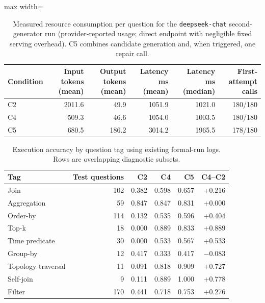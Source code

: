 \documentclass[11pt]{article}
\begin{document}
\begin{table}[htbp]
\caption{Measured resource consumption per question for the \texttt{deepseek-chat} second-generator run (provider-reported usage; direct endpoint with negligible fixed serving overhead). C5 combines candidate generation and, when triggered, one repair call.}
\label{tab:sup-deepseek-tokens}
\centering
\small
\begin{adjustbox}{max width=\textwidth}
\begin{tabular}{lrrrrr}
\toprule
\textbf{Condition} & \textbf{Input tokens (mean)} & \textbf{Output tokens (mean)} & \textbf{Latency ms (mean)} & \textbf{Latency ms (median)} & \textbf{First-attempt calls} \\
\midrule
C2 & 2011.6 & 49.9 & 1051.9 & 1021.0 & 180/180 \\
C4 & 509.3 & 46.6 & 1054.0 & 1003.5 & 180/180 \\
C5 & 680.5 & 186.2 & 3014.2 & 1965.5 & 178/180 \\
\bottomrule
\end{tabular}
\end{adjustbox}
\end{table}

\begin{table}[htbp]
\caption{Execution accuracy by question tag using existing formal-run logs. Rows are overlapping diagnostic subsets.}
\label{tab:sup-tags}
\centering
\small
\begin{tabular*}{\textwidth}{@{\extracolsep{\fill}}lrrrrr}
\toprule
\textbf{Tag} & \textbf{Test questions} & \textbf{C2} & \textbf{C4} & \textbf{C5} & \textbf{C4--C2} \\
\midrule
Join & 102 & 0.382 & 0.598 & 0.657 & +0.216 \\
Aggregation & 59 & 0.847 & 0.847 & 0.831 & +0.000 \\
Order-by & 114 & 0.132 & 0.535 & 0.596 & +0.404 \\
Top-k & 18 & 0.000 & 0.889 & 0.833 & +0.889 \\
Time predicate & 30 & 0.000 & 0.533 & 0.567 & +0.533 \\
Group-by & 12 & 0.417 & 0.333 & 0.417 & $-$0.083 \\
Topology traversal & 11 & 0.091 & 0.818 & 0.909 & +0.727 \\
Self-join & 9 & 0.111 & 0.889 & 1.000 & +0.778 \\
Filter & 170 & 0.441 & 0.718 & 0.753 & +0.276 \\
\bottomrule
\end{tabular*}
\end{table}
\end{document}
